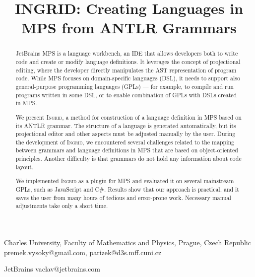 \documentclass[preprint,10pt,numbers]{sigplanconf}
\begin{document}



\title{INGRID: Creating Languages in MPS from ANTLR Grammars}


	{Charles University, Faculty of Mathematics and Physics, Prague, Czech Republic}
	{premek.vysoky@gmail.com, parizek@d3s.mff.cuni.cz}

	{JetBrains}
	{vaclav@jetbrains.com}


\maketitle

\begin{abstract}
JetBrains MPS is a language workbench, an IDE that allows developers both to write code and create or modify language definitions.
It leverages the concept of projectional editing, where the developer directly manipulates the AST representation of program code.
While MPS focuses on domain-specific languages (DSL), it needs to support also general-purpose programming languages (GPLs) --- for example, to compile and run programs written in some DSL, or to enable combination of GPLs with DSLs created in MPS.

We present \textsc{Ingrid}, a method for construction of a language definition in MPS based on its ANTLR grammar.
The structure of a language is generated automatically, but its projectional editor and other aspects must be adjusted manually by the user.
During the development of \textsc{Ingrid}, we encountered several challenges related to the mapping between grammars and language definitions in MPS that are based on object-oriented principles.
Another difficulty is that grammars do not hold any information about code layout.

We implemented \textsc{Ingrid} as a plugin for MPS and evaluated it on several mainstream GPLs, such as JavaScript and C\#.
Results show that our approach is practical, and it saves the user from many hours of tedious and error-prone work.
Necessary manual adjustments take only a short time.
\end{abstract}


\end{document}
